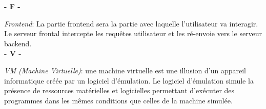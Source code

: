 \vskip 0.1cm
\textbf{- F -}\\
\vskip 0.1cm

\textit{Frontend}: La partie frontend sera la partie avec laquelle l'utilisateur va interagir. Le serveur frontal intercepte les requêtes utilisateur et les ré-envoie vers le serveur backend. \\

\vskip 0.1cm
\textbf{- V -}\\
\vskip 0.1cm

\textit{VM (Machine Virtuelle)}: une machine virtuelle est une illusion d'un appareil informatique créée par un logiciel d'émulation. Le logiciel d'émulation simule la présence de ressources matérielles et logicielles permettant d'exécuter des programmes dans les mêmes conditions que celles de la machine simulée.\\

